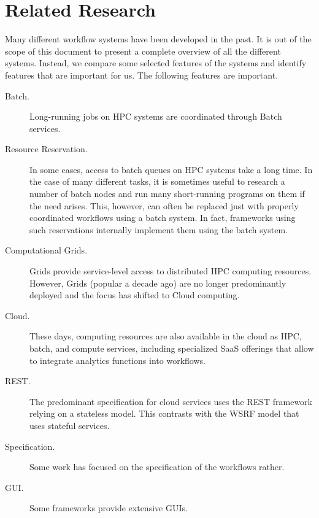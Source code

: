
\section{Related Research}

Many different workflow systems have been developed in the past. It
is out of the scope of this document to present a complete overview of all
the different systems. Instead, we compare some selected features of
the systems and identify features that are important for us. The
following features are important.

\begin{description}

\item[Batch.] Long-running jobs on HPC systems are coordinated through Batch services.

\item[Resource Reservation.] In some cases, access to batch queues on HPC systems take a long time. In the case of many different tasks, it is sometimes useful to research a number of batch nodes and run many short-running programs on them if the need arises. This, however, can often be replaced just with properly coordinated workflows using a batch system. In fact, frameworks using such reservations internally implement them using the batch system.

\item[Computational Grids.] Grids provide service-level access to distributed HPC computing resources. However, Grids (popular a decade ago) are no longer predominantly deployed and the focus has shifted to Cloud computing.

\item[Cloud.] These days, computing resources are also available in the cloud as HPC, batch, and compute services, including specialized SaaS offerings that allow to integrate analytics functions into workflows.

\item[REST.] The predominant specification for cloud services uses the REST framework relying on a stateless model. This contrasts with the WSRF model that uses stateful services.

\item[Specification.] Some work has focused on the specification of the workflows rather.

\item[GUI.] Some frameworks provide extensive GUIs.

\end{description}


